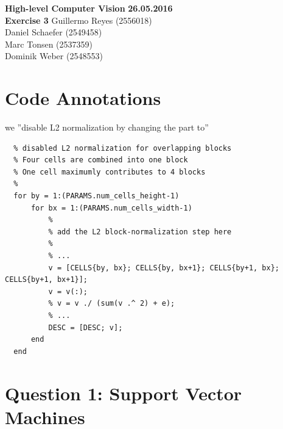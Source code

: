 \documentclass[12pt]{article}
\begin{document}

\noindent
{\Large \textbf{High-level Computer Vision}} \hfill \textbf{26.05.2016}\\
{\Large \textbf{Exercise 3}} 
\raggedleft \hfill Guillermo Reyes (2556018)\\
\hfill Daniel Schaefer (2549458)\\
\hfill Marc Tonsen (2537359)\\
\hfill Dominik Weber (2548553)\\

\raggedright


\section*{Code Annotations}
we ''disable L2 normalization by changing the part to''
\begin{verbatim}
  % disabled L2 normalization for overlapping blocks 
  % Four cells are combined into one block
  % One cell maximumly contributes to 4 blocks
  %
  for by = 1:(PARAMS.num_cells_height-1)
      for bx = 1:(PARAMS.num_cells_width-1)
          %
          % add the L2 block-normalization step here
          %
          % ...
          v = [CELLS{by, bx}; CELLS{by, bx+1}; CELLS{by+1, bx}; CELLS{by+1, bx+1}];
          v = v(:);
          % v = v ./ (sum(v .^ 2) + e);
          % ...
          DESC = [DESC; v];
      end
  end

\end{verbatim}




\section*{Question 1: Support Vector Machines}
\end{document}
